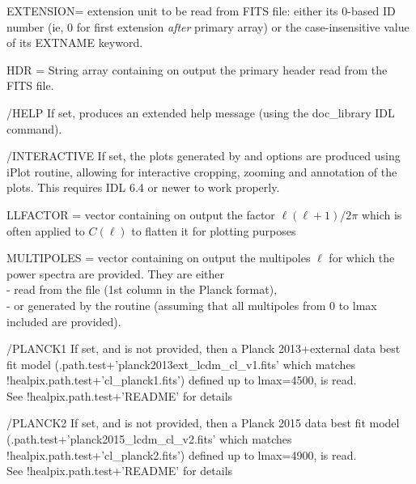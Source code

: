 \begin{keywords}
  \begin{kwlist}{} %
       \item[EXTENSION=]%
	extension unit to be read from FITS file: 
 either its 0-based ID number (ie, 0 for first extension {\em after} primary array) 
 or the case-insensitive value of its EXTNAME keyword.
    \item[HDR =] %
	String array containing on output the primary header
      read from the FITS file. 
    \item[/HELP] %
	If set, produces an extended help message (using the doc\_library
    IDL command). 
    \item[/INTERACTIVE] %
	If set, the plots generated by  and  options are produced using iPlot routine, allowing 
           for interactive cropping, zooming and annotation of the plots. This
           requires IDL 6.4 or newer to work properly.
    \item[LLFACTOR =] %
	vector containing on output the factor $\ell(\ell+1)/2\pi$ which is often
          applied to $C(\ell)$ to flatten it for plotting purposes
    \item[MULTIPOLES =] %
	vector containing on output the multipoles
    $\ell$ for which the power spectra are provided. They are either\\
           - read from the file (1st column in the Planck format),\\
          - or generated by the routine (assuming that all
               multipoles from 0 to lmax included are provided).
%
    \item[/PLANCK1] %
           If set, and  
           is not provided, then a Planck 2013+external data best fit
          model (.path.test+\-'planck2013ext\_lcdm\_cl\_v1.fits'
which matches !healpix.path.test+'cl\_planck1.fits') 
          defined up to lmax=4500, is read.\\
          See !healpix.path.test+'README' for details
%
    \item[/PLANCK2] %
           If set, and  
           is not provided, then a Planck 2015 data best fit
          model (.path.test+\-'planck2015\_lcdm\_cl\_v2.fits'
which matches !healpix.path.test+'cl\_planck2.fits') 
          defined up to lmax=4900, is read.\\
          See !healpix.path.test+'README' for details


\end{kwlist}
\end{keywords}
